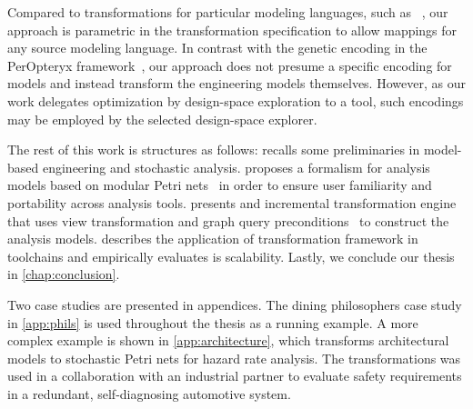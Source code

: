 Compared to transformations for particular modeling languages, such as ~, our approach is parametric in the transformation specification to allow mappings for any source modeling language. In contrast with the genetic encoding in the PerOpteryx framework~\citep{Koziolek11generic}, our approach does not presume a specific encoding for models and instead transform the engineering models themselves. However, as our work delegates optimization by design-space exploration to a  tool, such encodings may be employed by the selected design-space explorer.

The rest of this work is structures as follows:  recalls some preliminaries in model-based engineering and stochastic analysis.  proposes a formalism for analysis models based on modular Petri nets~\citep{Kindler09modular} in order to ensure user familiarity and portability across analysis tools.  presents and incremental transformation engine that uses view transformation and graph query preconditions~\citep{Debreceni14viewmodel} to construct the analysis models.  describes the application of transformation framework in  toolchains and empirically evaluates is scalability. Lastly, we conclude our thesis in \cref{chap:conclusion}.

Two case studies are presented in appendices. The dining philosophers case study in \cref{app:phils} is used throughout the thesis as a running example. A more complex example is shown in \cref{app:architecture}, which transforms architectural models to stochastic Petri nets for hazard rate analysis. The transformations was used in a collaboration with an industrial partner to evaluate safety requirements in a redundant, self-diagnosing automotive system.

